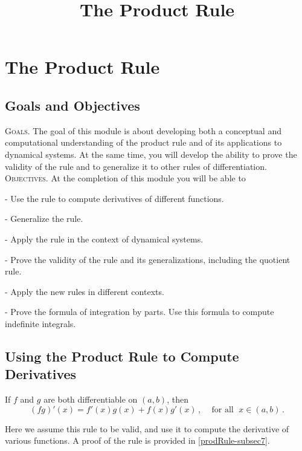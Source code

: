 \documentclass{ximera}
\title{The Product Rule}
\begin{document}
\maketitle
 
 \setcounter{chapter}{3}
\setcounter{section}{1}
\section{The Product Rule}
\subsection*{Goals and Objectives}

\textsc{Goals.} The goal of this module is about developing both a conceptual and computational understanding of the product rule and of its applications to dynamical systems. At the same time, you will develop the ability to prove the validity of the rule and to generalize it to other rules of differentiation.
\\

\noindent \textsc{Objectives.} At the completion of this module you will be able to

- Use the rule to compute derivatives of different functions.

- Generalize the rule.

- Apply the rule in the context of dynamical systems.

- Prove the validity of the rule and its generalizations, including the quotient rule.

- Apply the new rules in different contexts.

- Prove the formula of integration by parts. Use this formula to compute indefinite integrals.





\subsection{Using the Product Rule to Compute Derivatives}\label{prodRule-subsec1}

\begin{theorem} If \(f\) and \(g\) are both differentiable on \((a,b)\), then
 \[(f g)'(x)= f'(x) g(x)+ f(x) g'(x)\,,  \;\;\;  \text{ for all } \; x \in (a,b)\,.\]
\end{theorem}
Here we assume this rule to be valid, and use it to compute the derivative of various functions. A proof of the rule is provided in \ref{prodRule-subsec7}.
\end{document}
